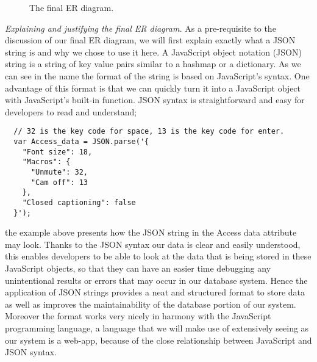 \begin{figure}[H]

\caption{The final ER diagram.}
\label{fig:erdf}
\end{figure}

\textit{Explaining and justifying the final ER diagram.}
As a pre-requisite to the discussion of our final ER diagram, 
we will first explain exactly what a JSON string is and why we
chose to use it here. A JavaScript object notation (JSON) 
string is a string of key value pairs similar to a hashmap or 
a dictionary. As we can see in the name the format of the
string is based on JavaScript's syntax. One advantage of this
format is that we can quickly turn it into a JavaScript object
with JavaScript's built-in  function. JSON
syntax is straightforward and easy for developers to read and
understand;

\begin{verbatim}
  // 32 is the key code for space, 13 is the key code for enter.
  var Access_data = JSON.parse('{
    "Font size": 18,
    "Macros": {
      "Unmute": 32,
      "Cam off": 13 
    },
    "Closed captioning": false
  }');
\end{verbatim}

the example above presents how the JSON string in the Access 
data attribute may look. Thanks to the JSON syntax our data 
is clear and easily understood, this enables developers to be
able to look at the data that is being stored in these 
JavaScript objects, so that they can have an easier time 
debugging any unintentional results or errors that may occur 
in our database system. Hence the application of JSON strings 
provides a neat and structured format to store data as well as
improves the maintainability of the database portion of our
system. Moreover the format works very nicely in harmony with
the JavaScript programming language, a language that we will
make use of extensively seeing as our system is a web-app, 
because of the close relationship between JavaScript and JSON
syntax. \\ \vspace{0.2cm}

